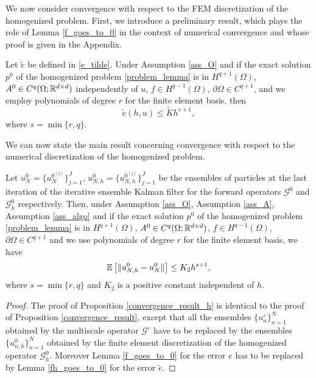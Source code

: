 We now consider convergence with respect to the FEM discretization of the homogenized problem. First, we introduce a preliminary result, which plays the role of Lemma \ref{f_goes_to_0} in the context of numerical convergence and whose proof is given in the Appendix.
\begin{lemma}
	\label{fh_goes_to_0}
	Let $\tilde{e}$ be defined in \eqref{e_tilde}. Under Assumption \ref{ass_O} and if the exact solution $p^0$ of the homogenized problem \eqref{problem_lemma} is in $H^{q+1}(\Omega)$, $A^0 \in C^q(\Omega;\mathbb{R}^{d \times d})$ independently of $u$, $f \in H^{q-1}(\Omega)$, $\partial \Omega \in C^{q+1}$, and we employ polynomials of degree $r$ for the finite element basis, then
	\[ \tilde{e}(h, u) \le \tilde{K} h^{s+1}, \]
	where $s = \min \{ r, q \}$.
\end{lemma}
We can now state the main result concerning convergence with respect to the numerical discretization of the homogenized problem.
\begin{proposition}
\label{convergence_result_h}
Let $u_{N}^0 = \{ u_{N}^{0^{(j)}} \}_{j=1}^J$, $u_{N,h}^0 = \{ u_{N,h}^{0^{(j)}} \}_{j=1}^J$ be the ensembles of particles at the last iteration of the iterative ensemble Kalman filter for the forward operators $\mathcal{G}^0$ and $\mathcal{G}_h^0$ respectively. Then, under Assumption \ref{ass_O}, Assumption \ref{ass_A}, Assumption \ref{ass_algo} and if the exact solution $p^0$ of the homogenized problem \eqref{problem_lemma} is in $H^{q+1}(\Omega)$, $A^0 \in C^q(\Omega;\mathbb{R}^{d \times d})$, $f \in H^{q-1}(\Omega)$, $\partial \Omega \in C^{q+1}$ and we use polynomials of degree $r$ for the finite element basis, we have
\[ \mathbb{E} \left [ \lVert u_{N,h}^0 - u_N^0\rVert \right ] \le K_2 h^{s+1}, \]
where $s = \min \{ r, q \}$ and $K_2$ is a positive constant independent of $h$.
\end{proposition}
\begin{proof}
The proof of Proposition \ref{convergence_result_h} is identical to the proof of Proposition \ref{convergence_result}, except that all the ensembles $\{ u_n^{\varepsilon} \}_{n=1}^N$ obtained by the multiscale operator $\mathcal{G}^{\varepsilon}$ have to be replaced by the ensembles $\{ u_{n,h}^0 \}_{n=1}^N$ obtained by the finite element discretization of the homogenized operator $\mathcal{G}^0_h$. Moreover Lemma \ref{f_goes_to_0} for the error $e$ has to be replaced by Lemma \ref{fh_goes_to_0} for the error $\tilde{e}$.
\end{proof}

